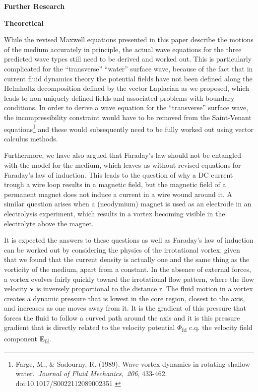 \documentclass[a4paper]{article}
\newcommand\textstyleNone[1]{#1}
\newcommand\textstyleappleconvertedspace[1]{#1}
\begin{document}
{\centering
\textstyleNone{\textbf{{Further Research}}}
\par}

{
\textstyleNone{\textbf{{Theoretical}}}}

{
\textstyleNone{{While the revised Maxwell equations presented in
this paper describe the motions of the medium accurately in principle, the actual wave equations for the three
predicted wave types still need to be derived and worked out. This is particularly complicated for the ``transverse''
``water'' surface wave, because of the fact that in current fluid dynamics theory the potential fields have not been
defined along the Helmholtz decomposition defined by the vector Laplacian as we proposed, which leads to non-uniquely
defined fields and associated }}\textstyleNone{{problems with
boundary conditions. In order to derive a wave equation for the ``transverse'' surface wave, the incompressibility
constraint would have to be removed from the Saint-Venant equations}}\footnote{
\textcolor[rgb]{0.09411765,0.09411765,0.09019608}{Farge, M., \& Sadourny, R. (1989). Wave-vortex dynamics in rotating
shallow
water.}\textstyleappleconvertedspace{\textcolor[rgb]{0.09411765,0.09411765,0.09019608}{~}}\textit{\textcolor[rgb]{0.09411765,0.09411765,0.09019608}{Journal
of Fluid
Mechanics,}}\textstyleappleconvertedspace{\textcolor[rgb]{0.09411765,0.09411765,0.09019608}{~}}\textit{\textcolor[rgb]{0.09411765,0.09411765,0.09019608}{206}}\textcolor[rgb]{0.09411765,0.09411765,0.09019608}{,
433-462. doi:10.1017/S0022112089002351 }\par }\textstyleNone{{ and
these would subsequently need to be fully worked out using vector calculus methods. }}}

{
\textstyleNone{{Furthermore, we have also argued that Faraday's law
should not be entangled with the model for the medium, which leaves us without revised equations for Faraday's law of
induction. This leads to the question of why a DC current trough a wire loop results in a magnetic field, but the
magnetic field of a permanent magnet does not induce a current in a wire wound around it. A similar question arises
when a (neodymium) magnet is used as an electrode in an electrolysis experiment, which results in a vortex becoming
visible in the electrolyte above the magnet.}}}

{
\textstyleNone{{It is expected the answers to these questions as
well as Faraday's law of induction can be worked out by considering the physics of the irrotational vortex, given that
we found that the current density is actually one and the same thing as the vorticity of the medium, apart from a
constant. In the absence of external forces, a vortex evolves fairly quickly toward the irrotational flow pattern,
where the flow velocity
}\textbf{{v}}{
is inversely proportional to the distance r. The fluid motion in a vortex creates a dynamic pressure that is lowest in
the core region, closest to the axis, and increases as one moves away from it. It is the gradient of this pressure that
forces the fluid to follow a curved path around the axis and it is this pressure gradient that is directly related to
the velocity potential $\Phi
$}{\textsubscript{fd}}{
c.q. the velocity field component
}\textbf{{E}}{\textsubscript{fd}}{.}}}
\end{document}

